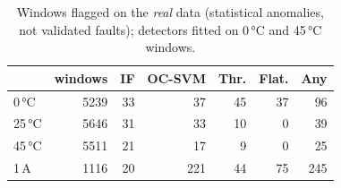 \begin{table}[htbp]\centering\footnotesize
\begin{tabular}{lrrrrrr}
\toprule
 & windows & IF & OC-SVM & Thr. & Flat. & Any \\
\midrule
0\,°C & 5239 & 33 & 37 & 45 & 37 & 96 \\
25\,°C & 5646 & 31 & 33 & 10 & 0 & 39 \\
45\,°C & 5511 & 21 & 17 & 9 & 0 & 25 \\
1\,A & 1116 & 20 & 221 & 44 & 75 & 245 \\
\bottomrule
\end{tabular}
\caption{Windows flagged on the \emph{real} data (statistical anomalies, not validated faults); detectors fitted on 0\,°C and 45\,°C windows.}\label{tab:faultreal}
\end{table}
